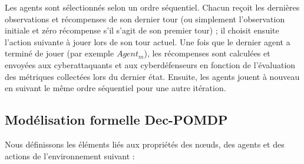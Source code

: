 \noindent
Les agents sont sélectionnés selon un ordre séquentiel. Chacun reçoit les dernières observations et récompenses de son dernier tour (ou simplement l'observation initiale et zéro récompense s'il s'agit de son premier tour) ; il choisit ensuite l'action suivante à jouer lors de son tour actuel. Une fois que le dernier agent a terminé de jouer (par exemple $Agent_m$), les récompenses sont calculées et envoyées aux cyberattaquants et aux cyberdéfenseurs en fonction de l'évaluation des métriques collectées lors du dernier état. Ensuite, les agents jouent à nouveau en suivant le même ordre séquentiel pour une autre itération.


\subsection{Modélisation formelle Dec-POMDP}

Nous définissons les éléments liés aux propriétés des nœuds, des agents et des actions de l'environnement suivant :

